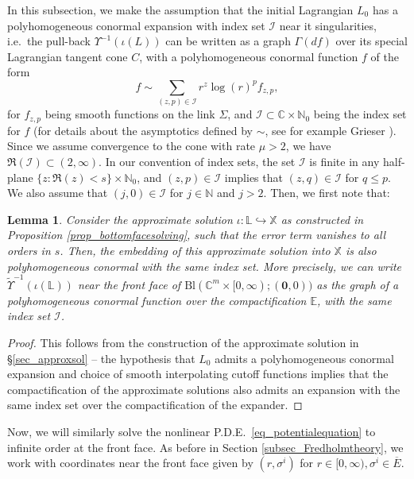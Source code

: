 \documentclass[10pt, a4paper]{article}
\theoremstyle{plain}%
\newtheorem{lem}[theorem]{Lemma}
\theoremstyle{definition}
\numberwithin{figure}{section}
\numberwithin{equation}{section}
\newcommand{\bL}{\mathbb{L}}
\newcommand{\bX}{\mathbb{X}}
\newcommand{\bC}{\mathbb{C}}
\newcommand{\bE}{\mathbb{E}}
\newcommand{\bN}{\mathbb{N}}
\newcommand{\tU}{\widetilde{\Upsilon}}
\newcommand{\oE}{{\overline{E}}}
\newcommand{\cI}{\mathcal{I}}
\newcommand{\Bl}{\mathrm{Bl}(\mathbb{C}^m\times[0,\infty); (\mathbf{0},0))}
\begin{document}
In this subsection, we make the assumption that the initial Lagrangian $L_0$ has a polyhomogeneous conormal expansion with index set $\cI$ near it singularities, i.e.\ the pull-back $\Upsilon^{-1}(\iota(L))$ can be written as a graph $\Gamma(df)$ over its special Lagrangian tangent cone $C$, with a polyhomogeneous conormal function $f$  of the form \[
f \sim \sum_{(z,p)\in \cI} r^z\log(r)^pf_{z,p},
\]
for $f_{z,p}$ being smooth functions on the link $\Sigma$, and $\cI \subset \bC\times \bN_0$ being the index set for $f$ (for details about the asymptotics defined by $\sim$, see for example Grieser \cite{Gre01}). Since we assume convergence to the cone with rate $\mu >2$, we have $\Re(\cI) \subset (2,\infty)$. In our convention of index sets, the set $\cI$ is finite in any half-plane $\{z:\Re(z)<s\}\times \bN_0$, and $(z,p)\in \cI$ implies that $(z,q)\in \cI$ for $q\leq p$. We also assume that $(j,0)\in \cI$ for $j\in \bN$ and $j>2$. Then, we first note that:
\begin{lem}\label{lem_embeddingpolycon}
	Consider the approximate solution $\iota:\bL \hookrightarrow \bX$ as constructed in Proposition \ref{prop_bottomfacesolving}, such that the error term vanishes to all orders in $s$. Then, the embedding of this approximate solution into $\bX$ is also polyhomogeneous conormal with the same index set. More precisely, we can write $\tU^{-1}(\iota(\bL))$ near the front face of $\Bl$ as the graph of a polyhomogeneous conormal function over the compactification $\bE$, with the same index set $\cI$.
\end{lem}
\begin{proof}
	This follows from the construction of the approximate solution in \S \ref{sec_approxsol} -- the hypothesis that $L_0$ admits a polyhomogeneous conormal expansion and choice of smooth interpolating cutoff functions implies that the compactification of the approximate solutions also admits an expansion with the same index set over the compactification of the expander. 
\end{proof}

Now, we will similarly solve the nonlinear P.D.E.\ \eqref{eq_potentialequation} to infinite order at the front face. As before in Section \ref{subsec_Fredholmtheory}, we work with coordinates near the front face given by $(r,\sigma^i)$ for $r\in[0,\infty), \sigma^i\in \oE$. 
\end{document}
